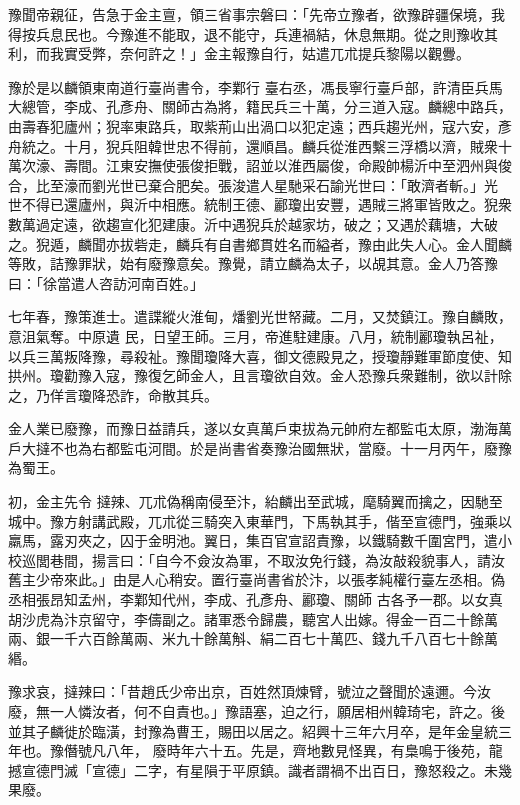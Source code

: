 \begin{pinyinscope}
 豫聞帝親征，告急于金主亶，領三省事宗磐曰：「先帝立豫者，欲豫辟疆保境，我得按兵息民也。今豫進不能取，退不能守，兵連禍結，休息無期。從之則豫收其利，而我實受弊，奈何許之！」金主報豫自行，姑遣兀朮提兵黎陽以觀釁。



 豫於是以麟領東南道行臺尚書令，李鄴行
 臺右丞，馮長寧行臺戶部，許清臣兵馬大總管，李成、孔彥舟、關師古為將，籍民兵三十萬，分三道入寇。麟總中路兵，由壽春犯廬州；猊率東路兵，取紫荊山出渦口以犯定遠；西兵趨光州，寇六安，彥舟統之。十月，猊兵阻韓世忠不得前，還順昌。麟兵從淮西繫三浮橋以濟，賊衆十萬次濠、壽間。江東安撫使張俊拒戰，詔並以淮西屬俊，命殿帥楊沂中至泗州與俊合，比至濠而劉光世已棄合肥矣。張浚遣人星馳采石諭光世曰：「敢濟者斬。」光
 世不得已還廬州，與沂中相應。統制王德、酈瓊出安豐，遇賊三將軍皆敗之。猊衆數萬過定遠，欲趨宣化犯建康。沂中遇猊兵於越家坊，破之；又遇於藕塘，大破之。猊遁，麟聞亦拔砦走，麟兵有自書鄉貫姓名而縊者，豫由此失人心。金人聞麟等敗，詰豫罪狀，始有廢豫意矣。豫覺，請立麟為太子，以覘其意。金人乃答豫曰：「徐當遣人咨訪河南百姓。」



 七年春，豫策進士。遣諜縱火淮甸，燔劉光世帑藏。二月，又焚鎮江。豫自麟敗，意沮氣奪。中原遺
 民，日望王師。三月，帝進駐建康。八月，統制酈瓊執呂祉，以兵三萬叛降豫，尋殺祉。豫聞瓊降大喜，御文德殿見之，授瓊靜難軍節度使、知拱州。瓊勸豫入寇，豫復乞師金人，且言瓊欲自效。金人恐豫兵衆難制，欲以計除之，乃佯言瓊降恐詐，命散其兵。



 金人業已廢豫，而豫日益請兵，遂以女真萬戶束拔為元帥府左都監屯太原，渤海萬戶大撻不也為右都監屯河間。於是尚書省奏豫治國無狀，當廢。十一月丙午，廢豫為蜀王。



 初，金主先令
 撻辣、兀朮偽稱南侵至汴，紿麟出至武城，麾騎翼而擒之，因馳至城中。豫方射講武殿，兀朮從三騎突入東華門，下馬執其手，偕至宣德門，強乘以羸馬，露刃夾之，囚于金明池。翼日，集百官宣詔責豫，以鐵騎數千圍宮門，遣小校巡閭巷間，揚言曰：「自今不僉汝為軍，不取汝免行錢，為汝敲殺貌事人，請汝舊主少帝來此。」由是人心稍安。置行臺尚書省於汴，以張孝純權行臺左丞相。偽丞相張昂知孟州，李鄴知代州，李成、孔彥舟、酈瓊、關師
 古各予一郡。以女真胡沙虎為汴京留守，李儔副之。諸軍悉令歸農，聽宮人出嫁。得金一百二十餘萬兩、銀一千六百餘萬兩、米九十餘萬斛、絹二百七十萬匹、錢九千八百七十餘萬緡。



 豫求哀，撻辣曰：「昔趙氏少帝出京，百姓然頂煉臂，號泣之聲聞於遠邇。今汝廢，無一人憐汝者，何不自責也。」豫語塞，迫之行，願居相州韓琦宅，許之。後並其子麟徙於臨潢，封豫為曹王，賜田以居之。紹興十三年六月卒，是年金皇統三年也。豫僭號凡八年，
 廢時年六十五。先是，齊地數見怪異，有梟鳴于後苑，龍撼宣德門滅「宣德」二字，有星隕于平原鎮。識者謂禍不出百日，豫怒殺之。未幾果廢。




\end{pinyinscope}
